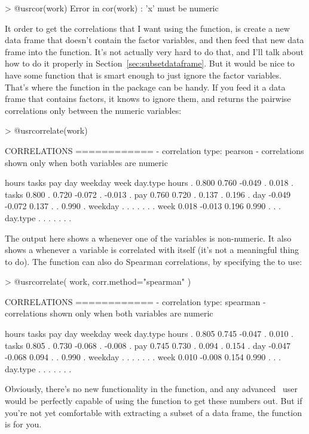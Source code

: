 \begin{rblock1}
> @usr{cor(work)}
Error in cor(work) : 'x' must be numeric
\end{rblock1}
It order to get the correlations that I want using the  function, is create a new data frame that doesn't contain the factor variables, and then feed that new data frame into the  function. It's not actually very hard to do that, and I'll talk about how to do it properly in Section~\ref{sec:subsetdataframe}. But it would be nice to have some function that is smart enough to just ignore the factor variables. That's where the  function in the  package can be handy. If you feed it a data frame that contains factors, it knows to ignore them, and returns the pairwise correlations only between the numeric variables:
\begin{rblock1}
> @usr{correlate(work)}

CORRELATIONS
============
- correlation type:  pearson 
- correlations shown only when both variables are numeric

          hours  tasks   pay    day weekday   week day.type
hours         .  0.800 0.760 -0.049       .  0.018        .
tasks     0.800      . 0.720 -0.072       . -0.013        .
pay       0.760  0.720     .  0.137       .  0.196        .
day      -0.049 -0.072 0.137      .       .  0.990        .
weekday       .      .     .      .       .      .        .
week      0.018 -0.013 0.196  0.990       .      .        .
day.type      .      .     .      .       .      .        .
\end{rblock1}
The output here shows a  whenever one of the variables is non-numeric. It also shows a  whenever a variable is correlated with itself (it's not a meaningful thing to do). The  function can also do Spearman correlations, by specifying the  to use:
\begin{rblock1}
> @usr{correlate( work, corr.method="spearman" )}

CORRELATIONS
============
- correlation type:  spearman 
- correlations shown only when both variables are numeric

          hours  tasks   pay    day weekday   week day.type
hours         .  0.805 0.745 -0.047       .  0.010        .
tasks     0.805      . 0.730 -0.068       . -0.008        .
pay       0.745  0.730     .  0.094       .  0.154        .
day      -0.047 -0.068 0.094      .       .  0.990        .
weekday       .      .     .      .       .      .        .
week      0.010 -0.008 0.154  0.990       .      .        .
day.type      .      .     .      .       .      .        .
\end{rblock1}
Obviously, there's no new functionality in the  function, and any advanced \R\ user would be perfectly capable of using the  function to get these numbers out. But if you're not yet comfortable with extracting a subset of a data frame, the  function is for you.


